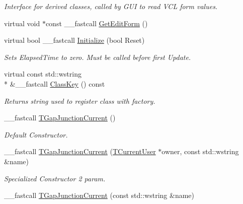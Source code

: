 \begin{DoxyCompactItemize}
\begin{DoxyCompactList}\small\item\em Interface for derived classes, called by G\+U\+I to read V\+C\+L form values. \end{DoxyCompactList}\item 
virtual void $\ast$const \+\_\+\+\_\+fastcall \hyperlink{class_t_gap_junction_current_a778ffd1b6c6d72562ad03fa42ef6b55f}{Get\+Edit\+Form} ()
\item 
virtual bool \+\_\+\+\_\+fastcall \hyperlink{class_t_gap_junction_current_a1cc5bf812766be4c91a656aef30c9cfd}{Initialize} (bool Reset)
\begin{DoxyCompactList}\small\item\em Sets Elapsed\+Time to zero. Must be called before first Update. \end{DoxyCompactList}\item 
virtual const std\+::wstring \\*
\&\+\_\+\+\_\+fastcall \hyperlink{class_t_gap_junction_current_af3f5986036ba62eb9d4441e72ccff617}{Class\+Key} () const 
\begin{DoxyCompactList}\small\item\em Returns string used to register class with factory. \end{DoxyCompactList}\item 
\hypertarget{class_t_gap_junction_current_a7b9831ba7c1a350ed719c01f45d8e87f}{\+\_\+\+\_\+fastcall \hyperlink{class_t_gap_junction_current_a7b9831ba7c1a350ed719c01f45d8e87f}{T\+Gap\+Junction\+Current} ()}\label{class_t_gap_junction_current_a7b9831ba7c1a350ed719c01f45d8e87f}

\begin{DoxyCompactList}\small\item\em Default Constructor. \end{DoxyCompactList}\item 
\hypertarget{class_t_gap_junction_current_afcda6e38e4703cf4d6cee205aff8b379}{\+\_\+\+\_\+fastcall \hyperlink{class_t_gap_junction_current_afcda6e38e4703cf4d6cee205aff8b379}{T\+Gap\+Junction\+Current} (\hyperlink{class_t_current_user}{T\+Current\+User} $\ast$owner, const std\+::wstring \&name)}\label{class_t_gap_junction_current_afcda6e38e4703cf4d6cee205aff8b379}

\begin{DoxyCompactList}\small\item\em Specialized Constructor 2 param. \end{DoxyCompactList}\item 
\hypertarget{class_t_gap_junction_current_a41a9c4ad281f266b6d09772d558e2308}{\+\_\+\+\_\+fastcall \hyperlink{class_t_gap_junction_current_a41a9c4ad281f266b6d09772d558e2308}{T\+Gap\+Junction\+Current} (const std\+::wstring \&name)}\label{class_t_gap_junction_current_a41a9c4ad281f266b6d09772d558e2308}


\end{DoxyCompactItemize}
